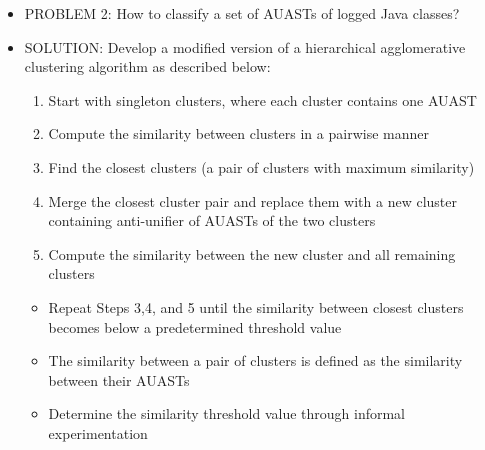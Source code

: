 \documentclass{article}
\newcommand{\tsc}{\textsc}
\begin{document}
\begin{itemize} [leftmargin=.1in]
\begin{itemize} [leftmargin=.1in]
\item Determines the best structural correspondences between AUAST nodes
\begin{itemize}
\item \tsc{SUBPROBLEM: }Despite having multiple potential anti-unifiers, we need to construct one single anti-unifier from the two AUASTs that is an approximation of the best fit to our problem
\item \tsc{SOLUTION: }Develop a greedy selection algorithm to approximate the best anti-unifier by determining the best correspondence (correspondence with the highest similarity) for each node
\end{itemize}
\item Develops a measure of similarity between the two AUASTs that
\begin{itemize}
\item refers to the number of identical simple values over the total number of simple values of their anti-unifier
\item calculates the similarity between simple values via the Jigsaw similarity function
\end{itemize}
\end{itemize}

\item \tsc{PROBLEM 2: }How to classify a set of AUASTs of logged Java classes?
\item \tsc{SOLUTION: }Develop a modified version of a hierarchical agglomerative clustering algorithm as described below:
\begin{enumerate}
\item Start with singleton clusters, where each cluster contains one AUAST
\item Compute the similarity between clusters in a pairwise manner
\item Find the closest clusters (a pair of clusters with maximum similarity)
\item Merge the closest cluster pair and replace them with a new cluster containing anti-unifier of AUASTs of the two clusters
\item Compute the similarity between the new cluster and all remaining clusters
\end{enumerate}
\begin{itemize}
\item Repeat Steps 3,4, and 5 until the similarity between closest clusters becomes below a predetermined threshold value
\item The similarity between a pair of clusters is defined as the similarity between their AUASTs
\item Determine the similarity threshold value through informal experimentation
\end{itemize}


\end{itemize}
\end{document}

